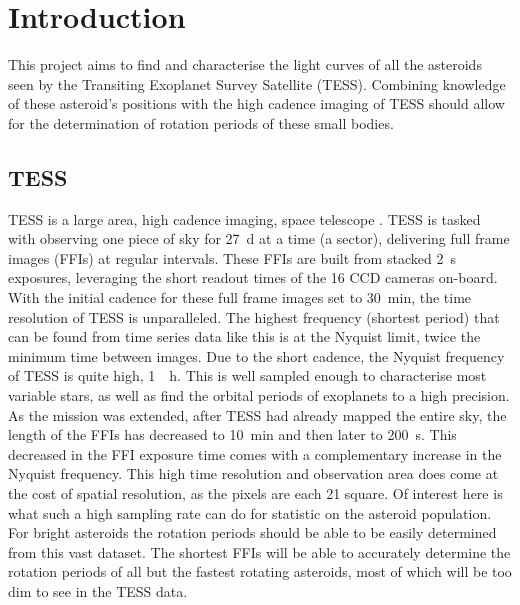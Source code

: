 \documentclass{UCreport}
\begin{document}
\toc %

\listoffigures
\newpage
{}
\listoftables
\newpage


\section{Introduction}\label{Sec:Intro}

This project aims to find and characterise the light curves of all the asteroids seen by the Transiting Exoplanet Survey Satellite (TESS).
Combining knowledge of these asteroid's positions with the high cadence imaging of TESS should allow for the determination of rotation periods of these small bodies.

\subsection{TESS}\label{SubSec:TESS}

TESS is a large area, high cadence imaging, space telescope  \citep{Ricker2014}.
TESS is tasked with observing one piece of sky for \qty{27}{\day} at a time (a sector), delivering  full frame images (FFIs) at regular intervals.
These FFIs are built from stacked \qty{2}{\second} exposures, leveraging the short readout times of the 16 CCD cameras on-board.
With the initial cadence for these full frame images set to \qty{30}{\minute}, the time resolution of TESS is unparalleled.
The highest frequency (shortest period) that can be found from time series data like this is at the Nyquist limit, twice the minimum time between images.
Due to the short cadence, the Nyquist frequency of TESS is quite high, \qty{1}{\per\hour}.
This is well sampled enough to characterise most variable stars, as well as find the orbital periods of exoplanets to a high precision.
As the mission was extended, after TESS had already mapped the entire sky, the length of the FFIs has decreased to \qty{10}{\minute} and then later to \qty{200}{\second}.
This decreased in the FFI exposure time comes with a complementary increase in the Nyquist frequency.
This high time resolution and observation area does come at the cost of spatial resolution, as the pixels are each \qty{21}{\arcsec} square.
Of interest here is what such a high sampling rate can do for statistic on the asteroid population.
For bright asteroids the rotation periods should be able to be easily determined from this vast dataset.
The shortest FFIs will be able to accurately determine the rotation periods of all but the fastest rotating asteroids, most of which will be too dim to see in the TESS data.
\end{document}
